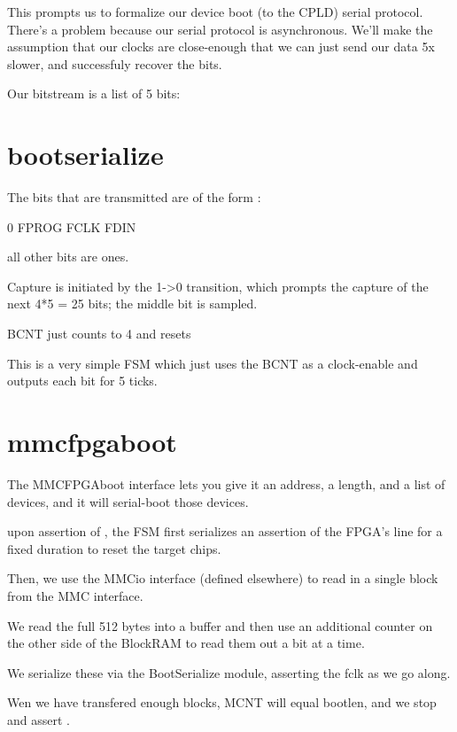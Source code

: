 This prompts us to formalize our device boot (to the CPLD) serial
protocol.  There's a problem because our serial protocol is
asynchronous. We'll make the assumption that our clocks are
close-enough that we can just send our data 5x slower, and successfuly
recover the bits.


Our bitstream is a list of 5 bits:


\section{bootserialize}

The bits that are transmitted are of the form : 

0
FPROG
FCLK
FDIN

all other bits are ones. 

Capture is initiated by the 1->0 transition, which prompts the capture
of the next 4*5 = 25 bits; the middle bit is sampled.

BCNT just counts to 4 and resets

This is a very simple FSM which just uses the BCNT as a clock-enable
and outputs each bit for 5 ticks.


\section{mmcfpgaboot}

The MMCFPGAboot interface lets you give it an address, a length, and a
list of devices, and it will serial-boot those devices.

upon assertion of , the FSM first serializes an
assertion of the FPGA's  line for a fixed duration to
reset the target chips.

Then, we use the MMCio interface (defined elsewhere) to read in a
single block from the MMC interface.

We read the full 512 bytes into a buffer and then use an additional
counter on the other side of the BlockRAM to read them out a bit at a
time. 

We serialize these via the BootSerialize module, asserting the fclk as
we go along.

Wen we have transfered enough blocks, MCNT will equal bootlen, and we
stop and assert .

